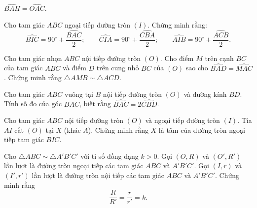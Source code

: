\begin{practice}
\begin{questions}[resume=SBT]
\begin{questions}
            \answerline
            \answerline
            \item $\widehat{BAH}=\widehat{OAC}$.

            \answerline
            \answerline
        \end{questions}

        \item Cho tam giác $ABC$ ngoại tiếp đường tròn $(I)$. Chứng minh rằng:
        \[
            \widehat{BIC}=90^\circ+\dfrac{\widehat{BAC}}{2};\qquad
            \widehat{CIA}=90^\circ+\dfrac{\widehat{CBA}}{2};\qquad
            \widehat{AIB}=90^\circ+\dfrac{\widehat{ACB}}{2}.
        \]

        \answerline
        \answerline
        \answerline

        \item Cho tam giác nhọn $ABC$ nội tiếp đường tròn $(O)$. Cho điểm $M$ trên cạnh $BC$ của tam giác $ABC$ và điểm $D$ trên cung nhỏ $BC$ của $(O)$ sao cho $\widehat{BAD}=\widehat{MAC}$. Chứng minh rằng $\triangle AMB\sim\triangle ACD$.

        \answerline
        \answerline
        \answerline

        \item Cho tam giác $ABC$ vuông tại $B$ nội tiếp đường tròn $(O)$ và đường kính $BD$. Tính số đo của góc $BAC$, biết rằng $\widehat{BAC}=2\widehat{CBD}$.

        \answerline
        \answerline

        \item Cho tam giác $ABC$ nội tiếp đường tròn $(O)$ và ngoại tiếp đường tròn $(I)$. Tia $AI$ cắt $(O)$ tại $X$ (khác $A$). Chứng minh rằng $X$ là tâm của đường tròn ngoại tiếp tam giác $BIC$.

        \answerline
        \answerline
        \answerline

        \item Cho $\triangle ABC\sim\triangle A'B'C'$ với tỉ số đồng dạng $k>0$. Gọi $(O,R)$ và $(O',R')$ lần lượt là đường tròn ngoại tiếp các tam giác $ABC$ và $A'B'C'$. Gọi $(I,r)$ và $(I',r')$ lần lượt là đường tròn nội tiếp các tam giác $ABC$ và $A'B'C'$. Chứng minh rằng
        \[
            \dfrac{R}{R'}=\dfrac{r}{r'}=k.
        \]

        \answerline
        \answerline
        \answerline
    \end{questions}
\end{practice}
